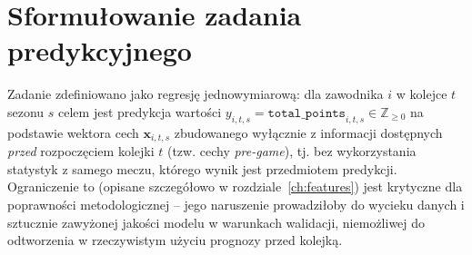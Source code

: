 \documentclass[a4paper,twoside,11pt]{mwrep}
\theoremstyle{plain} \newtheorem{thm}{Twierdzenie}
\theoremstyle{plain} \newtheorem{lem}{Lemat}
\theoremstyle{definition} \newtheorem{defn}{Definicja}
\theoremstyle{remark} \newtheorem*{rem}{Wniosek}
\begin{document}
\begin{table}[!htbp]

\renewcommand{\arraystretch}{0.92} 
\end{table}
\section{Sformułowanie zadania predykcyjnego}

Zadanie zdefiniowano jako regresję jednowymiarową: dla zawodnika $i$ w
kolejce $t$ sezonu $s$ celem jest predykcja wartości
$y_{i,t,s} = \texttt{total\_points}_{i,t,s} \in \mathbb{Z}_{\geq 0}$
na podstawie wektora cech $\mathbf{x}_{i,t,s}$ zbudowanego wyłącznie z
informacji dostępnych \emph{przed} rozpoczęciem kolejki $t$ (tzw. cechy
\emph{pre-game}), tj. bez wykorzystania statystyk z samego meczu, którego
wynik jest przedmiotem predykcji. Ograniczenie to (opisane szczegółowo w
rozdziale~\ref{ch:features}) jest krytyczne dla poprawności metodologicznej
-- jego naruszenie prowadziłoby do wycieku danych i sztucznie zawyżonej
jakości modelu w warunkach walidacji, niemożliwej do odtworzenia w
rzeczywistym użyciu prognozy przed kolejką.
\end{document}
